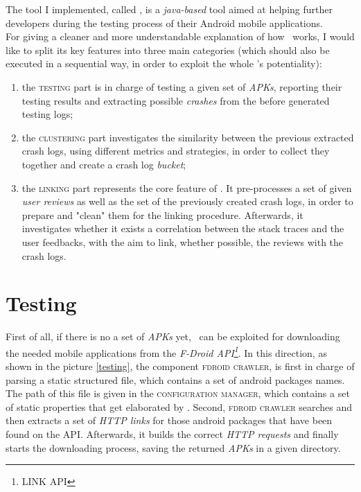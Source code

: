 The tool I implemented, called \toolname, is a \textit{java-based} tool aimed at helping further developers during the testing process of their Android mobile applications. \\
For giving a cleaner and more understandable explanation of how \toolname\ works, I would like to split its key features into three main categories (which should also be executed in a sequential way, in order to exploit the whole \toolname's potentiality): 
\begin{enumerate}
\item the \textsc{testing} part is in charge of testing a given set of \textit{APKs}, reporting their testing results and extracting possible \textit{crashes} from the before generated testing logs; 

\item the \textsc{clustering} part investigates the similarity between the previous extracted crash logs, using different metrics and strategies, in order to collect they together and create a crash log \textit{bucket}; 

\item the \textsc{linking} part represents the core feature of \toolname. It pre-processes a set of given \textit{user reviews} as well as the set of the previously created crash logs, in order to prepare and "clean" them for the linking procedure.  Afterwards, it investigates whether it exists a correlation between the stack traces and the user feedbacks, with the aim to link, whether possible, the reviews with the crash logs. 
\end{enumerate}

\section{Testing}
First of all, if there is no a set of \textit{APKs} yet, \toolname\ can be exploited for downloading the needed mobile applications from the \textit{F-Droid API\footnote{LINK API}}. In this direction, as shown in the picture \ref{testing}, the component \textsc{fdroid crawler}, is first in charge of  parsing a static structured file, which contains a set of android packages names. 
The path of this file is given in the \textsc{configuration manager}, which contains a set of static properties that get elaborated by \toolname. Second, \textsc{fdroid crawler} searches and then extracts a set of \textit{HTTP links} for those android packages that have been found on the API. Afterwards, it builds the correct \textit{HTTP requests} and finally starts the downloading process, saving the returned \textit{APKs} in a given directory.

